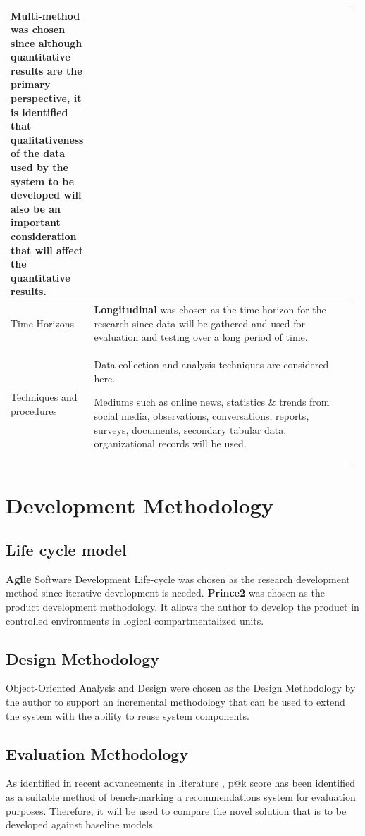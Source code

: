 \documentclass[a4paper, 12pt, oneside]{report}
\begin{document}
\begin{longtable}{| p{0.22\linewidth} | p{0.75\linewidth}|}
\textbf{Multi-method} was chosen since although \textbf{quantitative results} are the primary  perspective, it is identified that \textbf{qualitativeness} of the data used by the system to be developed will also be an important consideration that will affect the quantitative results.\\
\hline
Time Horizons  & 

\textbf{Longitudinal} was chosen as the time horizon for the research since data will be gathered and used for evaluation and testing over a long period of time.\\
\hline
Techniques and procedures &  Data collection and analysis techniques are considered here.

Mediums such as online news, statistics \& trends from social media, observations, conversations, reports, surveys, documents, secondary tabular data, organizational records will be used.\\
\hline
\end{longtable}


\section{Development Methodology}
\subsection{Life cycle model}
\textbf{Agile} Software Development Life-cycle was chosen as the research development method since iterative development is needed. \textbf{Prince2}  was chosen as the product development methodology. It allows the author to develop the product in controlled environments in logical compartmentalized units.


\subsection{Design Methodology}
Object-Oriented Analysis and Design were chosen as the Design Methodology by the author to support an incremental methodology that can be used to extend the system with the ability to reuse system components.

\subsection{Evaluation Methodology}
As identified in recent advancements in literature \autocite{larry_history_2019}, \gls{p@k} score has been identified as a suitable method of bench-marking a recommendations system for evaluation purposes. Therefore, it will be used to compare the novel solution that is to be developed against baseline models.
\end{document}
